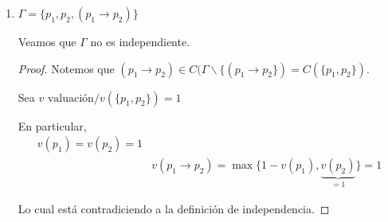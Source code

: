 \begin{enumerate}
\begin{proof}
\begin{enumerate}
                    Sea $v_g$ la única valuación que extiende a $g$.

                    \begin{align*}
                        \implies& v_g(p_1)=g(p_1)=1 \\
                        & v_g(p_1 \to p_2)= \max 
                        \{\underbrace{1-\underbrace{v_g(p_1)}_{=1}}_{=0}, 
                        \underbrace{v_g(p_2)}_{=0}\} = 0
                    \end{align*}

                    Es decir,
                    $v_g(\Gamma \backslash \{ \alpha \}) = 1$ y
                    $v_g(\alpha) = 0$

                    \begin{gather*}
                        \implies \alpha \notin 
                        C(\Gamma \backslash \{ \alpha \})
                    \end{gather*}
        \end{enumerate}

        \begin{gather*}
            \therefore ~ \Gamma \text{ es independiente.}
        \end{gather*}

        \end{proof}

    \item $\Gamma = \{ p_1, p_2, (p_1 \to p_2)\}$

        Veamos que $\Gamma$ no es independiente.

        \begin{proof} \phantom{.}
                
            Notemos que 
            $(p_1 \to p_2) \in C(\Gamma \backslash \{ (p_1\to p_2 \}) 
            = C(\{ p_1, p_2 \})$.

            \medskip

            Sea $v \text{ valuación}/v(\{ p_1,p_2 \})=1$

            En particular,
            \begin{align*}
                v(p_1) = v(p_2) = 1 \\
                & v(p_1\to p_2) = \max \{1-v(p_1), 
                \underbrace{v(p_2)}_{=1}\} = 1
            \end{align*}

            Lo cual está contradiciendo a la definición de 
            independencia.


\end{proof}
\end{enumerate}
